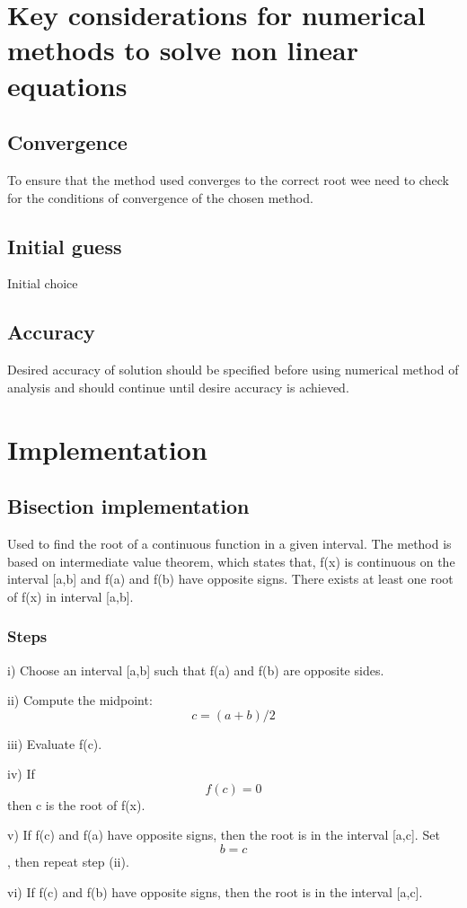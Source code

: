 \documentclass[10pt,a4paper,oneside]{article}
\begin{document}
\section{Key considerations for numerical methods to solve non linear equations}
\subsection{Convergence}
To ensure that the method used converges to the correct root wee need to check for the conditions of convergence of the chosen method.

\subsection{Initial guess}
Initial choice 
\subsection{Accuracy} Desired accuracy of solution should be specified before using numerical method of analysis and should continue until desire accuracy is achieved.
\section{Implementation}

\subsection{Bisection implementation}
Used to find the root of a continuous function in a given interval.
The method is based on intermediate value theorem, which states that, f(x) is continuous on the interval [a,b] and f(a) and f(b) have opposite signs. 
There exists at least one root of f(x) in interval [a,b].
\subsubsection{Steps}
i) Choose an interval [a,b] such that f(a) and f(b) are opposite sides.

ii) Compute the midpoint: $$ c=(a+b)/2 $$

iii) Evaluate f(c).

iv) If $$ f(c) = 0 $$ then c is the root of f(x).

v) If f(c) and f(a) have opposite signs, then the root is in the interval [a,c].
Set $$ b = c $$ , then repeat step (ii).

vi) If f(c) and f(b) have opposite signs, then the root is in the interval [a,c].
\end{document}

